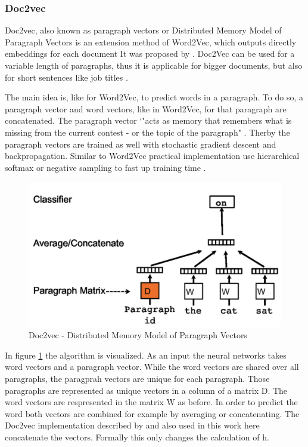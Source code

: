 \documentclass[12pt, a4paper, titlepage]{article}
\begin{document}
\subsubsection{Doc2vec}
Doc2vec, also known as paragraph vectors or Distributed Memory Model of Paragraph Vectors is an extension method of Word2Vec, which outputs directly embeddings for each document \citep{lau2016} It was proposed by \cite{le2014}. Doc2Vec can be used for a variable length of paragraphs, thus it is applicable for bigger documents, but also for short sentences like job titles \citep{le2014}. 

The main idea is, like for Word2Vec, to predict words in a paragraph. To do so, a paragraph vector and word vectors, like in Word2Vec, for that paragraph are concatenated. The paragraph vector `"acts as memory that remembers what is missing from the current contest - or the topic of the paragraph" \citep[3]{le2014}. Therby the paragraph vectors are trained as well with stochastic gradient descent and backpropagation. Similar to Word2Vec practical implementation use hierarchical softmax or negative sampling to fast up training time \citep{lau2016}. 

\begin{figure}[]
  \center
  \includegraphics[scale=0.5]{doc2vec.png}
  \caption{\label{fig: F2} Doc2vec - Distributed Memory Model of Paragraph Vectors \citep[3]{le2014}}
\end{figure}

In figure \ref{fig: F2} the algorithm is visualized. As an input the neural networks takes word vectors and a paragraph vector. While the word vectors are shared over all paragraphs, the paragprah vectors are unique for each paragraph. Those paragraphs are represented as unique vectors in a column of a matrix D. The word vectors are respresented in the matrix W as before. In order to predict the word both vectors are combined for example by averaging or concatenating. The Doc2vec implementation described by \citet{le2014} and also used in this work here concatenate the vectors. Formally this only changes the calculation of h. \citep{lau2016}
\end{document}
